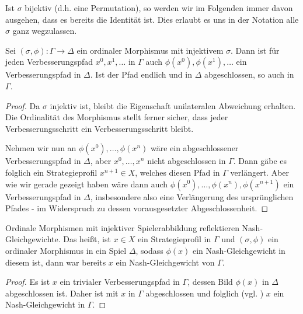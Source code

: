 \begin{notation}
	Ist $\sigma$ bijektiv (d.h. eine Permutation), so werden wir im Folgenden immer davon ausgehen, dass es bereits die Identität ist. Dies erlaubt es uns in der Notation alle $\sigma$ ganz wegzulassen.
\end{notation}

\begin{prop}
	Sei $(\sigma, \phi): \Gamma \to \Delta$ ein ordinaler Morphismus mit injektivem $\sigma$. Dann ist für jeden Verbesserungspfad $x^0, x^1, \dots$ in $\Gamma$ auch $\phi(x^0), \phi(x^1), \dots$ ein Verbesserungspfad in $\Delta$. Ist der Pfad endlich und in $\Delta$ abgeschlossen, so auch in $\Gamma$.
\end{prop}

\begin{proof}
	Da $\sigma$ injektiv ist, bleibt die Eigenschaft unilateralen Abweichung erhalten. Die Ordinalität des Morphismus stellt ferner sicher, dass jeder Verbesserungsschritt ein Verbesserungsschritt bleibt.
	
	Nehmen wir nun an $\phi(x^0), \dots, \phi(x^n)$ wäre ein abgeschlossener Verbesserungspfad in $\Delta$, aber $x^0, \dots, x^n$ nicht abgeschlossen in $\Gamma$. Dann gäbe es folglich ein Strategieprofil $x^{n+1} \in X$, welches diesen Pfad in $\Gamma$ verlängert. Aber wie wir gerade gezeigt haben wäre dann auch $\phi(x^0), \dots, \phi(x^n), \phi(x^{n+1})$ ein Verbesserungspfad in $\Delta$, insbesondere also eine Verlängerung des ursprünglichen Pfades - im Widerspruch zu dessen vorausgesetzter Abgeschlossenheit.
\end{proof}

\begin{kor}\label{kor:ReflektNG}
	Ordinale Morphismen mit injektiver Spielerabbildung reflektieren Nash-Gleichgewichte. Das heißt, ist $x \in X$ ein Strategieprofil in $\Gamma$ und $(\sigma, \phi)$ ein ordinaler Morphismus in ein Spiel $\Delta$, sodass $\phi(x)$ ein Nash-Gleichgewicht in diesem ist, dann war bereits $x$ ein Nash-Gleichgewicht von $\Gamma$.
\end{kor}

\begin{proof}
	Es ist $x$ ein trivialer Verbesserungspfad in $\Gamma$, dessen Bild $\phi(x)$ in $\Delta$ abgeschlossen ist. Daher ist mit   $x$ in $\Gamma$ abgeschlossen und folglich (vgl. ) $x$ ein Nash-Gleichgewicht in $\Gamma$.
\end{proof}

